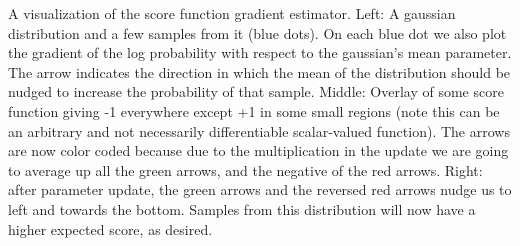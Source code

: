 \documentclass[12pt,a4paper]{article}
\begin{document}
A visualization of the score function gradient estimator. Left: A gaussian distribution and a few samples from it (blue dots). On each blue dot we also plot the gradient of the log probability with respect to the gaussian's mean parameter. The arrow indicates the direction in which the mean of the distribution should be nudged to increase the probability of that sample. Middle: Overlay of some score function giving -1 everywhere except +1 in some small regions (note this can be an arbitrary and not necessarily differentiable scalar-valued function). The arrows are now color coded because due to the multiplication in the update we are going to average up all the green arrows, and the negative of the red arrows. Right: after parameter update, the green arrows and the reversed red arrows nudge us to left and towards the bottom. Samples from this distribution will now have a higher expected score, as desired.\\
\end{document}
